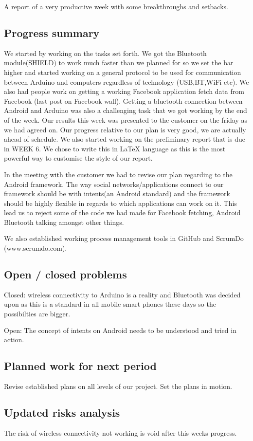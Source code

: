 A report of a very productive week with some breakthroughs and setbacks.

\subsection{Progress summary}
We started by working on the tasks set forth. We got the Bluetooth module(SHIELD) to work much faster than we planned for so we set the bar higher and started working on a general protocol to be used for communication between Arduino and computers regardless of technology (USB,BT,WiFi etc). We also had people work on getting a working Facebook application fetch data from Facebook (last post on Facebook wall). Getting a bluetooth connection between Android and Arduino was also a challenging task that we got working by the end of the week. Our results this week was presented to the customer on the friday as we had agreed on. Our progress relative to our plan is very good, we are actually ahead of schedule.
We also started working on the preliminary report that is due in WEEK 6. We chose to write this in LaTeX language as this is the most powerful way to customise the style of our report. 

In the meeting with the customer we had to revise our plan regarding to the Android framework. The way social networks/applications connect to our framework should be with intents(an Android standard) and the framework should be highly flexible in regards to which applications can work on it. This lead us to reject some of the code we had made for Facebook fetching, Android Bluetooth talking amongst other things.


We also established working process management tools in GitHub and ScrumDo (www.scrumdo.com). 


\subsection{Open / closed problems}
Closed: wireless connectivity to Arduino is a reality and Bluetooth was decided upon as this is a standard in all mobile smart phones these days so the possibilties are bigger.

Open:
The concept of intents on Android needs to be understood and tried in action.


\subsection{Planned work for next period}
Revise established plans on all levels of our project.
Set the plans in motion.

\subsection{Updated risks analysis}
The risk of wireless connectivity not working is void after this weeks progress.